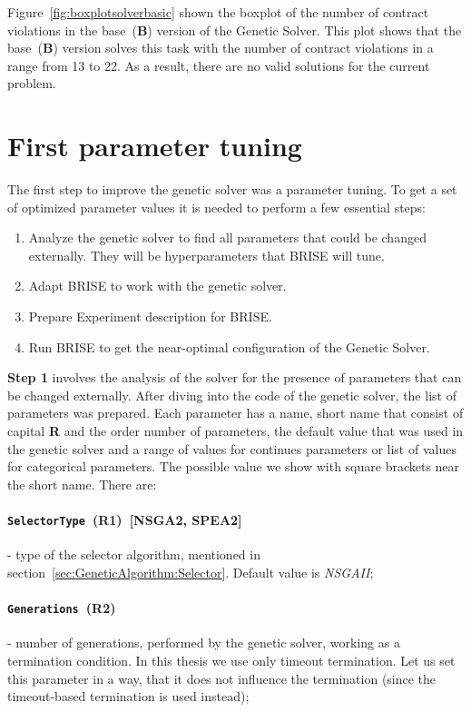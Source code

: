Figure~\ref{fig:boxplotsolverbasic} shown the boxplot of the number of contract violations in the base~(\textbf{B}) version of the Genetic Solver. This plot shows that  the base~(\textbf{B}) version solves this task with the number of contract violations in a range from 13 to 22. As a result, there are no valid solutions for the current problem.




\section{First parameter tuning}

The first step to improve the genetic solver was a parameter tuning. To get a set of optimized parameter values it is needed to perform a few essential steps:

\begin{enumerate}
	\item Analyze the genetic solver to find all parameters that could be changed externally. They will be hyperparameters that BRISE will tune.
	\item Adapt BRISE to work with the genetic solver.
	\item Prepare Experiment description for BRISE.
	\item Run BRISE to get the near-optimal configuration of the Genetic Solver.
\end{enumerate}

\textbf{Step 1} involves the analysis of the solver for the presence of parameters that can be changed externally. After diving into the code of the genetic solver, the list of parameters was prepared. Each parameter has a name, short name that consist of capital \textbf{R} and the order number of parameters, the default value that was used in the genetic solver and a range of values for continues parameters or list of values for categorical parameters. The possible value we show with square brackets near the short name. There are:
\paragraph{\texttt{SelectorType}~(R1)~[NSGA2, SPEA2]} - type of the selector algorithm, mentioned in section~\ref{sec:GeneticAlgorithm:Selector}. Default value is \textit{NSGAII};
\paragraph{\texttt{Generations}~(R2)} - number of generations, performed by the genetic solver, working as a termination condition. In this thesis we use only timeout termination. Let us set this parameter in a way, that it does not influence the termination (since the timeout-based termination is used instead);
